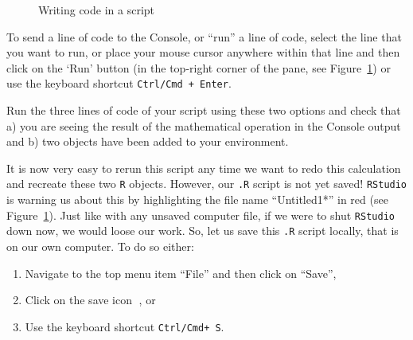 \documentclass[
  letterpaper,
  DIV=11,
  numbers=noendperiod]{scrreprt}
\providecommand{\tightlist}{%
  \setlength{\itemsep}{0pt}\setlength{\parskip}{0pt}}\usepackage{longtable,booktabs,array}
\begin{document}
\begin{figure}


\caption{\label{fig-NewScript}Writing code in a script}

\end{figure}%

To send a line of code to the Console, or ``run'' a line of code, select
the line that you want to run, or place your mouse cursor anywhere
within that line and then click on the `Run' button (in the top-right
corner of the pane, see Figure~\ref{fig-NewScript}) or use the keyboard
shortcut \texttt{Ctrl/Cmd\ +\ Enter}.

Run the three lines of code of your script using these two options and
check that a) you are seeing the result of the mathematical operation in
the Console output and b) two objects have been added to your
environment.

It is now very easy to rerun this script any time we want to redo this
calculation and recreate these two \texttt{R} objects. However, our
\texttt{.R} script is not yet saved! \texttt{RStudio} is warning us
about this by highlighting the file name ``Untitled1*'' in red (see
Figure~\ref{fig-NewScript}). Just like with any unsaved computer file,
if we were to shut \texttt{RStudio} down now, we would loose our work.
So, let us save this \texttt{.R} script locally, that is on our own
computer. To do so either:

\begin{enumerate}
\def\labelenumi{\arabic{enumi}.}
\tightlist
\item
  Navigate to the top menu item ``File'' and then click on ``Save'',
\item
  Click on the save icon 💾, or
\item
  Use the keyboard shortcut \texttt{Ctrl/Cmd+\ S}.
\end{enumerate}
\end{document}
